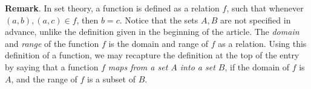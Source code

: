\documentclass[12pt]{article}
\begin{document}
\textbf{Remark}.  In set theory, a function is defined as a relation $f$, such that whenever $(a,b),(a,c)\in f$, then $b=c$.  Notice that the sets $A,B$ are not specified in advance, unlike the definition given in the beginning of the article.  The \emph{domain} and \emph{range} of the function $f$ is the domain and range of $f$ as a relation.  Using this definition of a function, we may recapture the definition at the top of the entry by saying that a function $f$ \emph{maps from a set $A$ into a set $B$}, if the domain of $f$ is $A$, and the range of $f$ is a subset of $B$.
\end{document}
